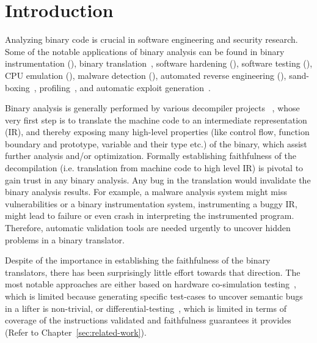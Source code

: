 \chapter{Introduction}\label{sec:ba}

Analyzing binary code is crucial in software engineering and security research.
Some of the notable applications of binary analysis can be found in binary
instrumentation
(\cite{Bruening:CGO2003,PEBIL10,Pin:2005,Valgrind:ENTCS03,DynamoRIO:2004}),
  binary translation~\cite{UQBT:2000}, software hardening
  (\cite{Cha:2015,Ford:2008,Zhang,Zhang:2013}), software testing
  (\cite{Chipounov:2011,Avgerinos:2014,godefroid_automated_2008}), CPU
  emulation (\cite{QEMU:USENIX05,Magnusson:2002}), malware detection
  (\cite{Christodorescu:2005,Kruegel:2004,BitBlaze:2008,BAP:CAV11,Egele:USENIX07,Yin:CCS07}),
  automated reverse engineering
  (\cite{Cui:2008,Lin:2008,Schwartz:2013,Yakdan2015NDSS,McSema:Recon14,Angr,Radare2}),
  sand-boxing~\cite{Kiriansky:2002:SEV,Erlingsson:2006,Yee:2009},
  profiling~\cite{Harris:2005,Srivastava:1994}, and automatic exploit
  generation~\cite{Cha:2012}.
               
                 Binary analysis is generally performed by various decompiler
                 projects
                 ~\cite{McSema:Recon14,Remill,Angr1,BAP:CAV11,Radare2}, whose
                 very first step is to translate the machine code to an
                 intermediate representation (IR), and thereby exposing many
                 high-level properties (like control flow, function boundary
                     and prototype, variable and their type etc.) of the
                 binary, which  assist further analysis and/or optimization.
                 Formally establishing faithfulness of the decompilation (i.e.
                     translation from machine code to high level IR) is pivotal
                 to gain trust in any binary analysis. Any bug in the
                 translation would invalidate the binary analysis results.  For
                 example, a malware analysis system might miss vulnerabilities
                 or a binary instrumentation system, instrumenting a buggy IR,
                 might lead to failure or even crash in interpreting the
                 instrumented program. Therefore, automatic validation tools
                 are needed urgently to uncover hidden problems in a binary
                 translator. 

Despite of the importance in establishing the faithfulness of the binary
translators, there has been surprisingly little effort towards that direction.
The most notable approaches are either based on hardware co-simulation
testing~\cite{Martignoni:ISSTA2009,Martignoni:ISSTA2010}, which is limited
because generating specific test-cases to uncover semantic bugs in a lifter is
non-trivial, or differential-testing~\cite{Martignoni:ASPLOS2012,ASE2017},
  which is limited in terms of coverage of the instructions validated and
  faithfulness guarantees it provides (Refer to
      Chapter~\ref{sec:related-work}). 

